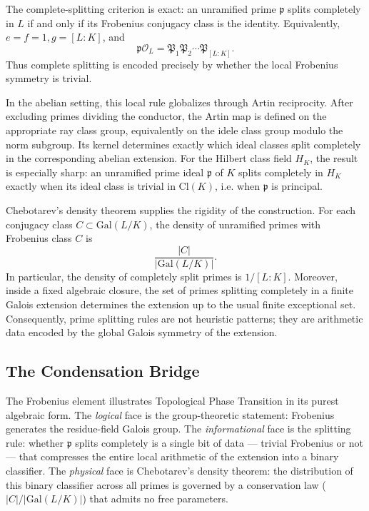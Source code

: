 The complete-splitting criterion is exact: an unramified prime $\mathfrak{p}$ splits completely in $L$ if and only if its Frobenius conjugacy class is the identity. Equivalently, $e = f = 1, g = [L : K]$, and
\begin{equation}
\mathfrak{p}\mathcal{O}_L = \mathfrak{P}_1\mathfrak{P}_2\cdots\mathfrak{P}_{[L:K]}.
\end{equation}
Thus complete splitting is encoded precisely by whether the local Frobenius symmetry is trivial.

In the abelian setting, this local rule globalizes through Artin reciprocity. After excluding primes dividing the conductor, the Artin map is defined on the appropriate ray class group, equivalently on the idele class group modulo the norm subgroup. Its kernel determines exactly which ideal classes split completely in the corresponding abelian extension. For the Hilbert class field $H_K$, the result is especially sharp: an unramified prime ideal $\mathfrak{p}$ of $K$ splits completely in $H_K$ exactly when its ideal class is trivial in $\text{Cl}(K)$, i.e. when $\mathfrak{p}$ is principal.

Chebotarev's density theorem supplies the rigidity of the construction. For each conjugacy class $C \subset \text{Gal}(L/K)$, the density of unramified primes with Frobenius class $C$ is
\begin{equation}
\frac{|C|}{|\text{Gal}(L/K)|}.
\end{equation}
In particular, the density of completely split primes is $1/[L : K]$. Moreover, inside a fixed algebraic closure, the set of primes splitting completely in a finite Galois extension determines the extension up to the usual finite exceptional set. Consequently, prime splitting rules are not heuristic patterns; they are arithmetic data encoded by the global Galois symmetry of the extension.


\subsection*{The Condensation Bridge}

The Frobenius element illustrates Topological Phase Transition in its purest algebraic form. The \emph{logical} face is the group-theoretic statement: Frobenius generates the residue-field Galois group. The \emph{informational} face is the splitting rule: whether $\mathfrak{p}$ splits completely is a single bit of data --- trivial Frobenius or not --- that compresses the entire local arithmetic of the extension into a binary classifier. The \emph{physical} face is Chebotarev's density theorem: the distribution of this binary classifier across all primes is governed by a conservation law ($|C|/|\mathrm{Gal}(L/K)|$) that admits no free parameters.

